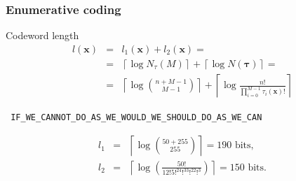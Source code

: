 \documentclass[14pt]{beamer}
\renewcommand{\vec}[1]{\ensuremath{\boldsymbol{#1}}}
\begin{document}
\begin{frame}
\frametitle{Enumerative coding}
\begin{itemize}    
\footnotesize {
    
    \item Codeword length 
    \begin{eqnarray}
    \label{eq3_27}
    l(\vec x) &=& l_1 (\vec x) + l_2 (\vec x) =
    \nonumber\\
    &=&\left\lceil \log N_\tau (M) \right\rceil + \left\lceil \log
    N(\vec \tau ) \right\rceil = \nonumber\\
    &=& \left\lceil \log \binom {n+M-1}{M-1} \right\rceil + \left\lceil
    \log \frac{n!}{\prod_{i = 0}^{M - 1} \tau _i (\vec x)!} \right\rceil
    \end{eqnarray}
    
    \item
    \begin{center}
    {\texttt{
    IF\_WE{\_}CANNOT{\_}DO{\_}AS{\_}WE{\_}WOULD{\_}WE{\_}SHOULD{\_}DO{\_}AS{\_}WE{\_}CAN} }\\
    \end{center}
    

    \item 
    \begin{eqnarray*}
    l_1 &=& \left\lceil \log \binom {50 + 255} {255} \right\rceil = 190
    \mbox{ bits} ,\\
    l_2 &=& \left\lceil {\log \left( {\frac{50!}{12!5!^24!^33!^22!^3}}
    \right)} \right\rceil = 150 \mbox{ bits} .
    \end{eqnarray*}
}
\end{itemize}
\end{frame}
\end{document}
